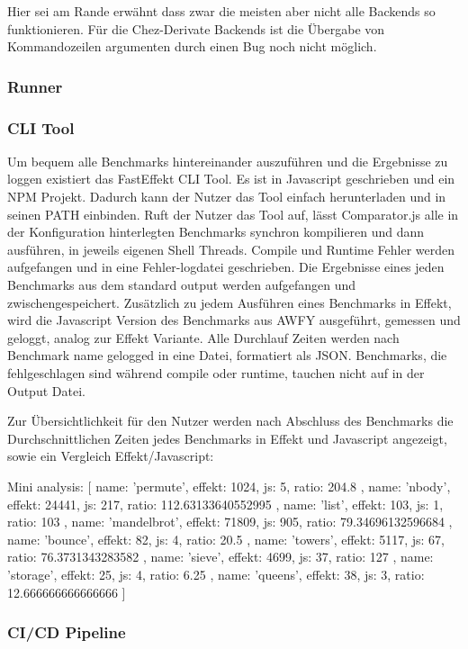 Hier sei am Rande erwähnt dass zwar die meisten aber nicht alle Backends so funktionieren. Für die Chez-Derivate Backends ist die Übergabe von Kommandozeilen argumenten durch einen Bug noch nicht möglich.

\subsubsection{ Runner }
\subsubsection{ CLI Tool }
  
Um bequem alle Benchmarks hintereinander auszuführen und die Ergebnisse zu loggen existiert das FastEffekt CLI Tool.
Es ist in Javascript geschrieben und ein NPM Projekt. Dadurch kann der Nutzer das Tool einfach herunterladen und in seinen PATH einbinden.
Ruft der Nutzer das Tool auf, lässt Comparator.js alle in der Konfiguration hinterlegten Benchmarks synchron kompilieren und dann ausführen, in jeweils eigenen Shell Threads. Compile und Runtime Fehler werden aufgefangen und in eine Fehler-logdatei geschrieben. Die Ergebnisse eines jeden Benchmarks aus dem standard output werden aufgefangen und zwischengespeichert.
Zusätzlich zu jedem Ausführen eines Benchmarks in Effekt, wird die Javascript Version des Benchmarks aus AWFY ausgeführt, gemessen und geloggt, analog zur Effekt Variante.
Alle Durchlauf Zeiten werden nach Benchmark name gelogged in eine Datei, formatiert als JSON.
Benchmarks, die fehlgeschlagen sind während compile oder runtime, tauchen nicht auf in der Output Datei.

Zur Übersichtlichkeit für den Nutzer werden nach Abschluss des Benchmarks die Durchschnittlichen Zeiten jedes Benchmarks in Effekt und Javascript angezeigt, sowie ein Vergleich Effekt/Javascript:

Mini analysis: [
{ name: 'permute', effekt: 1024, js: 5, ratio: 204.8 },
{ name: 'nbody', effekt: 24441, js: 217, ratio: 112.63133640552995 },
{ name: 'list', effekt: 103, js: 1, ratio: 103 },
{
name: 'mandelbrot',
effekt: 71809,
js: 905,
ratio: 79.34696132596684
},
{ name: 'bounce', effekt: 82, js: 4, ratio: 20.5 },
{ name: 'towers', effekt: 5117, js: 67, ratio: 76.3731343283582 },
{ name: 'sieve', effekt: 4699, js: 37, ratio: 127 },
{ name: 'storage', effekt: 25, js: 4, ratio: 6.25 },
{ name: 'queens', effekt: 38, js: 3, ratio: 12.666666666666666 }
] 


\subsubsection{ CI/CD Pipeline }

